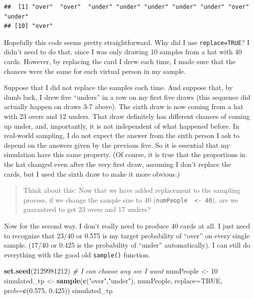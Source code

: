 \documentclass[openany]{book}
\newenvironment{Shaded}{\begin{snugshade}}{\end{snugshade}}
\newcommand{\CommentTok}[1]{\textcolor[rgb]{0.56,0.35,0.01}{\textit{#1}}}
\newcommand{\DataTypeTok}[1]{\textcolor[rgb]{0.13,0.29,0.53}{#1}}
\newcommand{\DecValTok}[1]{\textcolor[rgb]{0.00,0.00,0.81}{#1}}
\newcommand{\FloatTok}[1]{\textcolor[rgb]{0.00,0.00,0.81}{#1}}
\newcommand{\KeywordTok}[1]{\textcolor[rgb]{0.13,0.29,0.53}{\textbf{#1}}}
\newcommand{\NormalTok}[1]{#1}
\newcommand{\OtherTok}[1]{\textcolor[rgb]{0.56,0.35,0.01}{#1}}
\newcommand{\StringTok}[1]{\textcolor[rgb]{0.31,0.60,0.02}{#1}}
\begin{document}
\begin{verbatim}
##  [1] "over"  "over"  "under" "under" "under" "under" "under" "over"  "under"
## [10] "over"
\end{verbatim}

Hopefully this code seems pretty straightforward. Why did I use \texttt{replace=TRUE}? I didn't need to do that, since I was only drawing 10 samples from a hat with 40 cards. However, by replacing the card I drew each time, I made sure that the chances were the same for each virtual person in my sample.

Suppose that I did not replace the samples each time. And suppose that, by dumb luck, I drew five ``unders'' in a row on my first five draws (this sequence did actually happen on draws 3-7 above). The sixth draw is now coming from a hat with 23 overs and 12 unders. That draw definitely has different chances of coming up under, and, importantly, it is not independent of what happened before. In real-world sampling, I do not expect the answer from the sixth person I ask to depend on the answers given by the previous five. So it is essential that my simulation have this same property. (Of course, it is true that the proportions in the hat changed even after the very first draw, assuming I don't replace the cards, but I used the sixth draw to make it more obvious.)

\begin{quote}
Think about this: Now that we have added replacement to the sampling process, if we change the sample size to 40 (\texttt{numPeople\ \ \textless{}-\ 40}), are we guaranteed to get 23 overs and 17 unders?
\end{quote}

Now for the second way. I don't really need to produce 40 cards at all. I just need to recognize that 23/40 or 0.575 is my target probability of ``over'' on every single sample. (17/40 or 0.425 is the probability of ``under'' automatically). I can still do everything with the good old \texttt{sample()} function.

\begin{Shaded}
\begin{Highlighting}[]
\KeywordTok{set.seed}\NormalTok{(}\DecValTok{2129981212}\NormalTok{) }\CommentTok{# I can choose any see I want}
\NormalTok{numPeople <-}\StringTok{ }\DecValTok{10}
\NormalTok{simulated_tp <-}\StringTok{ }\KeywordTok{sample}\NormalTok{(}\KeywordTok{c}\NormalTok{(}\StringTok{"over"}\NormalTok{,}\StringTok{"under"}\NormalTok{), numPeople, }\DataTypeTok{replace=}\OtherTok{TRUE}\NormalTok{, }\DataTypeTok{prob=}\KeywordTok{c}\NormalTok{(}\FloatTok{0.575}\NormalTok{, }\FloatTok{0.425}\NormalTok{))}
\NormalTok{simulated_tp}
\end{Highlighting}
\end{Shaded}
\end{document}
